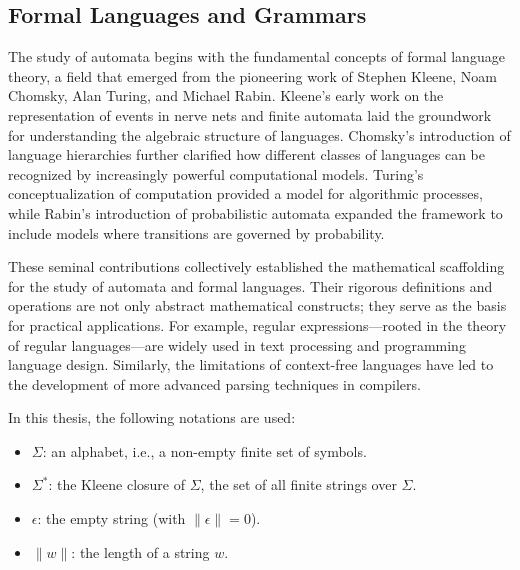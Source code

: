 \subsection{Formal Languages and Grammars}
\label{subsec:formal-languages-and-grammars}


The study of automata begins with the fundamental concepts of formal language theory, a field that emerged from the pioneering work of Stephen Kleene, Noam Chomsky, Alan Turing, and Michael Rabin. Kleene's early work on the representation of events in nerve nets and finite automata \cite{kleene1956representation} laid the groundwork for understanding the algebraic structure of languages. Chomsky’s introduction of language hierarchies \cite{chomsky1956three} further clarified how different classes of languages can be recognized by increasingly powerful computational models. Turing's conceptualization of computation \cite{hopcroft2006introduction} provided a model for algorithmic processes, while Rabin's introduction of probabilistic automata \cite{rabin1963probabilistic} expanded the framework to include models where transitions are governed by probability. 

These seminal contributions collectively established the mathematical scaffolding for the study of automata and formal languages. Their rigorous definitions and operations are not only abstract mathematical constructs; they serve as the basis for practical applications. For example, regular expressions—rooted in the theory of regular languages—are widely used in text processing and programming language design. Similarly, the limitations of context-free languages have led to the development of more advanced parsing techniques in compilers.



\begin{notation}[Symbols]
In this thesis, the following notations are used:
\begin{itemize}
    \item $\Sigma$: an alphabet, i.e., a non-empty finite set of symbols.
    \item $\Sigma^\ast$: the Kleene closure of $\Sigma$, the set of all finite strings over $\Sigma$.
    \item $\epsilon$: the empty string (with $\|\epsilon\| = 0$).
    \item $\|w\|$: the length of a string $w$.
\end{itemize}
\end{notation}

